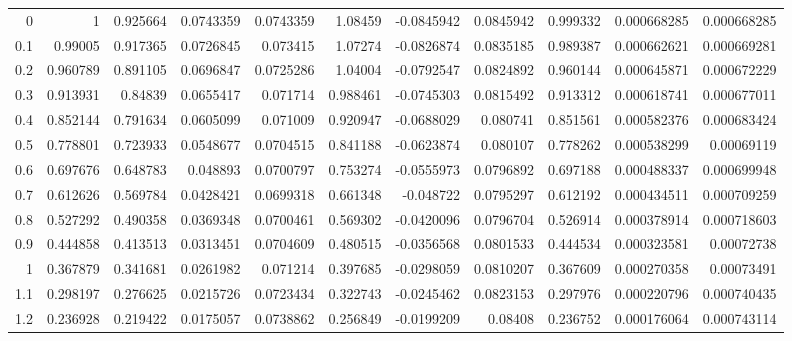 {\begin{tabular}{rrrrrrrrrrr}
  0 & 1          & 0.925664   &   0.0743359   &     0.0743359 & 1.08459    &  -0.0845942   &     0.0845942 & 0.999332   &   0.000668285 &   0.000668285 \\
  0.1         & 0.99005    & 0.917365   &   0.0726845   &     0.073415  & 1.07274    &  -0.0826874   &     0.0835185 & 0.989387   &   0.000662621 &   0.000669281 \\
  0.2         & 0.960789   & 0.891105   &   0.0696847   &     0.0725286 & 1.04004    &  -0.0792547   &     0.0824892 & 0.960144   &   0.000645871 &   0.000672229 \\
  0.3         & 0.913931   & 0.84839    &   0.0655417   &     0.071714  & 0.988461   &  -0.0745303   &     0.0815492 & 0.913312   &   0.000618741 &   0.000677011 \\
  0.4         & 0.852144   & 0.791634   &   0.0605099   &     0.071009  & 0.920947   &  -0.0688029   &     0.080741  & 0.851561   &   0.000582376 &   0.000683424 \\
  0.5         & 0.778801   & 0.723933   &   0.0548677   &     0.0704515 & 0.841188   &  -0.0623874   &     0.080107  & 0.778262   &   0.000538299 &   0.00069119  \\
  0.6         & 0.697676   & 0.648783   &   0.048893    &     0.0700797 & 0.753274   &  -0.0555973   &     0.0796892 & 0.697188   &   0.000488337 &   0.000699948 \\
  0.7         & 0.612626   & 0.569784   &   0.0428421   &     0.0699318 & 0.661348   &  -0.048722    &     0.0795297 & 0.612192   &   0.000434511 &   0.000709259 \\
  0.8         & 0.527292   & 0.490358   &   0.0369348   &     0.0700461 & 0.569302   &  -0.0420096   &     0.0796704 & 0.526914   &   0.000378914 &   0.000718603 \\
  0.9         & 0.444858   & 0.413513   &   0.0313451   &     0.0704609 & 0.480515   &  -0.0356568   &     0.0801533 & 0.444534   &   0.000323581 &   0.00072738  \\
  1           & 0.367879   & 0.341681   &   0.0261982   &     0.071214  & 0.397685   &  -0.0298059   &     0.0810207 & 0.367609   &   0.000270358 &   0.00073491  \\
  1.1         & 0.298197   & 0.276625   &   0.0215726   &     0.0723434 & 0.322743   &  -0.0245462   &     0.0823153 & 0.297976   &   0.000220796 &   0.000740435 \\
  1.2         & 0.236928   & 0.219422   &   0.0175057   &     0.0738862 & 0.256849   &  -0.0199209   &     0.08408   & 0.236752   &   0.000176064 &   0.000743114 \\

\end{tabular}}
